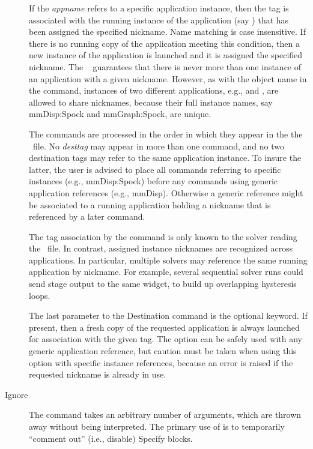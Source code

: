 \begin{description}
If the \textit{appname} refers to a specific application instance, then
the tag is associated with the running instance of the application (say
) that has been assigned the specified nickname.  Name
matching is case insensitive.  If there is no running copy of the
application meeting this condition, then a new instance of the
application is launched and it is assigned the specified nickname.  The
\OOMMF\  guarantees
that there is never more than one instance of an application with a
given nickname.  However, as with the object name in the 
command, instances of two different applications, e.g.,  and
, are allowed to share nicknames, because their full
instance names, say mmDisp:Spock and mmGraph:Spock, are unique.

The  commands are processed in the order in which they
appear in the the \MIF\ file.  No \textit{desttag} may appear in more
than one  command, and no two destination tags may refer
to the same application instance.  To insure the latter, the user is
advised to place all  commands referring to specific
instances (e.g., mmDisp:Spock) before any  commands
using generic application references (e.g., mmDisp).  Otherwise a
generic reference might be associated to a running application holding a
nickname that is referenced by a later  command.

The tag association by the  command is only known to the
solver reading the \MIF\ file.  In contrast, assigned instance nicknames
are recognized across applications.  In particular, multiple solvers may
reference the same running application by nickname.  For example,
several sequential solver runs could send stage output to the same
 widget, to build up overlapping hysteresis loops.

The last parameter to the Destination command is the optional
 keyword.  If present, then a fresh copy of the requested
application is always launched for association with the given tag.  The
 option can be safely used with any generic application
reference, but caution must be taken when using this option with
specific instance references, because an error is raised if the
requested nickname is already in use.

\item[Ignore\label{html:mif2Ignore}]
The  command takes an arbitrary number of arguments, which
are thrown away without being interpreted.  The primary use of
 is to temporarily ``comment out'' (i.e., disable) Specify
blocks.


\end{description}
